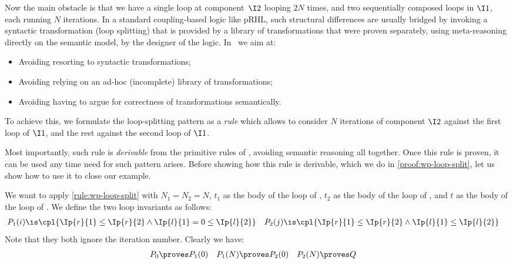 Now the main obstacle is that we have a single loop at component~$\I2$
looping $2N$ times, and two sequentially composed loops in $\I1$,
each running $N$ iterations.
In a standard coupling-based logic like pRHL,
such structural differences are usually bridged by invoking a
syntactic transformation (\eg loop splitting) that is provided
by a library of transformations that were proven separately, using meta-reasoning directly on the semantic model,
by the designer of the logic.
In \thelogic\ we aim at:
\begin{itemize}
  \item Avoiding resorting to syntactic transformations;
  \item Avoiding relying on an ad-hoc (incomplete) library of transformations;
  \item Avoiding having to argue for correctness of transformations semantically.
\end{itemize}
To achieve this, we formulate the loop-splitting pattern as a \emph{rule}
which allows to consider $N$ iterations of component $\I2$ against the first loop of $\I1$, and the rest against the second loop of $\I1$.
\begin{proofrule}
     
\end{proofrule}

Most importantly, such rule is \emph{derivable} from the primitive rules of \thelogic, avoiding semantic reasoning all together.
Once this rule is proven, it can be used any time need for such pattern arises.
Before showing how this rule is derivable,
which we do in \cref{proof:wp-loop-split},
let us show how to use it to close our example.

We want to apply \ref{rule:wp-loop-split} with $N_1=N_2=N$,
$t_1$ as the body of the loop of ,
$t_2$ as the body of the loop of ,
and
$t$ as the body of the loop of .
We define the two loop invariants as follows:
\begin{align*}
  P_1(i) &\is
    \cpl{
      \Ip{r}{1}\leq\Ip{r}{2}
      \land
      \Ip{l}{1}=0\leq\Ip{l}{2}
    }
  &
  P_2(j) &\is
    \cpl{
      \Ip{r}{1}\leq\Ip{r}{2}
      \land
      \Ip{l}{1}\leq\Ip{l}{2}
    }
\end{align*}
Note that they both ignore the iteration number.
Clearly we have:
\begin{align*}
  P_0 &\proves P_1(0)
  &
  P_1(N) &\proves P_2(0)
  &
  P_2(N) &\proves Q
\end{align*}

